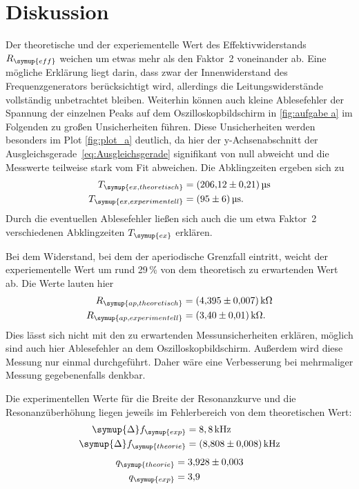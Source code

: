 \section{Diskussion}
\label{sec:Diskussion}
Der theoretische und der experiementelle Wert des Effektivwiderstands $R_{\symup{eff}}$ weichen um etwas mehr als den Faktor~2
voneinander ab. Eine mögliche Erklärung liegt darin, dass zwar der Innenwiderstand des Frequenzgenerators berücksichtigt wird, allerdings
die Leitungswiderstände vollständig unbetrachtet bleiben. Weiterhin können auch kleine Ablesefehler der Spannung der einzelnen Peaks auf
dem Oszilloskopbildschirm in \autoref{fig:aufgabe a} im Folgenden zu großen Unsicherheiten führen.
Diese Unsicherheiten werden besonders im Plot \autoref{fig:plot_a} deutlich, da hier der y-Achsenabschnitt der 
Ausgleichsgerade~\eqref{eq:Ausgleichsgerade} signifikant von null abweicht und die Messwerte teilweise stark vom Fit abweichen.
Die Abklingzeiten ergeben sich zu
\begin{align*}
    T_{\symup{ex, theoretisch}} &= \qty{206,12+-0,21}{\micro\second} \\
    T_{\symup{ex, experimentell}} &= \qty{95+-6}{\micro\second}. 
\end{align*}
Durch die eventuellen Ablesefehler ließen sich auch die um etwa Faktor~2 verschiedenen Abklingzeiten $T_{\symup{ex}}$ erklären.

Bei dem Widerstand, bei dem der aperiodische Grenzfall eintritt, weicht der experiementelle Wert um rund 29\,\% von dem theoretisch zu 
erwartenden Wert ab. Die Werte lauten hier
\begin{align*}
    R_{\symup{ap,theoretisch}} &= \qty{4,395+-0,007}{\kilo\ohm} \\
    R_{\symup{ap,experimentell}} &= \qty{3,40+-0,01}{\kilo\ohm}.
\end{align*} 
Dies lässt sich nicht mit den zu erwartenden Messunsicherheiten erklären, möglich sind auch hier Ablesefehler
an dem Oszilloskopbildschirm. Außerdem wird diese Messung nur einmal durchgeführt. Daher wäre eine Verbesserung bei mehrmaliger Messung
gegebenenfalls denkbar.

Die experimentellen Werte für die Breite der Resonanzkurve und die Resonanzüberhöhung liegen jeweils im Fehlerbereich von dem theoretischen
Wert:
\begin{align*}
    \symup{\Delta}f_{\symup{exp}} &= 8,8\,\unit{\kilo\hertz} \\
    \symup{\Delta}f_{\symup{theorie}} &= \qty{8.808+-0.008}{\kilo\hertz}
\end{align*}
\begin{align*}
    q_{\symup{theorie}} &= \num{3.928+-0.003} \\
    q_{\symup{exp}} &= \num{3,9}
\end{align*}

